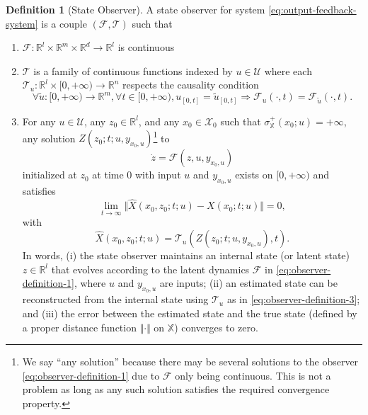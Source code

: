 \documentclass[
]{book}
\theoremstyle{definition}
\newtheorem{definition}{Definition}[chapter]
\theoremstyle{definition}
\theoremstyle{definition}
\theoremstyle{definition}
\theoremstyle{remark}
\begin{document}
\begin{definition}[State Observer]
\protect\hypertarget{def:stateobserver}{}\label{def:stateobserver}A state observer for system \eqref{eq:output-feedback-system} is a couple \((\mathcal{F},\mathcal{T})\) such that

\begin{enumerate}
\def\labelenumi{\arabic{enumi}.}
\item
  \(\mathcal{F}: \mathbb{R}^{l} \times \mathbb{R}^{m} \times \mathbb{R}^d \rightarrow \mathbb{R}^l\) is continuous
\item
  \(\mathcal{T}\) is a family of continuous functions indexed by \(u \in \mathcal{U}\) where each \(\mathcal{T}_u: \mathbb{R}^l \times [0,+\infty) \rightarrow \mathbb{R}^n\) respects the causality condition
  \[
  \forall \tilde{u}: [0,+\infty) \rightarrow \mathbb{R}^m,\forall t \in [0,+\infty), u_{[0,t]} = \tilde{u}_{[0,t]} \Rightarrow  \mathcal{F}_u (\cdot,t) = \mathcal{F}_{\tilde{u}}(\cdot,t).
  \]
\item
  For any \(u \in \mathcal{U}\), any \(z_0 \in \mathbb{R}^l\), and any \(x_0 \in \mathcal{X}_0\) such that \(\sigma^+_{\mathbb{X}}(x_0;u) = +\infty\), any solution \(Z(z_0;t;u,y_{x_0,u})\)\footnote{We say ``any solution'' because there may be several solutions to the observer \eqref{eq:observer-definition-1} due to \(\mathcal{F}\) only being continuous. This is not a problem as long as any such solution satisfies the required convergence property.} to
  \begin{equation}
  \dot{z} = \mathcal{F}(z,u,y_{x_0,u})
  \label{eq:observer-definition-1}
  \end{equation}
  initialized at \(z_0\) at time \(0\) with input \(u\) and \(y_{x_0,u}\) exists on \([0,+\infty)\) and satisfies
  \begin{equation}
  \lim_{t \rightarrow \infty} \Vert \hat{X}(x_0,z_0;t;u) - X(x_0;t;u) \Vert = 0,
  \label{eq:observer-definition-2}
  \end{equation}
  with
  \begin{equation}
  \hat{X}(x_0,z_0;t;u) = \mathcal{T}_u(Z(z_0;t;u,y_{x_0,u}),t).
  \label{eq:observer-definition-3}
  \end{equation}
  In words, (i) the state observer maintains an internal state (or latent state) \(z \in \mathbb{R}^l\) that evolves according to the latent dynamics \(\mathcal{F}\) in \eqref{eq:observer-definition-1}, where \(u\) and \(y_{x_0,u}\) are inputs; (ii) an estimated state can be reconstructed from the internal state using \(\mathcal{T}_u\) as in \eqref{eq:observer-definition-3}; and (iii) the error between the estimated state and the true state (defined by a proper distance function \(\Vert \cdot \Vert\) on \(\mathbb{X}\)) converges to zero.
\end{enumerate}


\end{definition}
\end{document}
